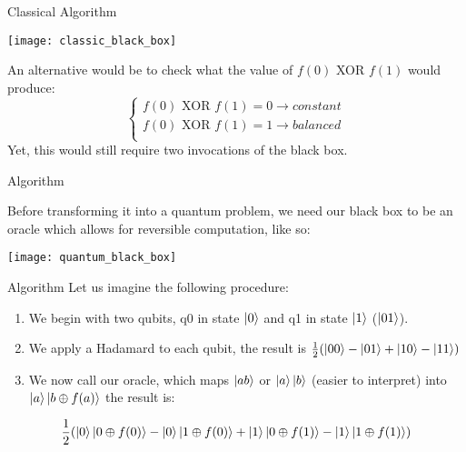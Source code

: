 \documentclass[aspectratio=43]{beamer}
\begin{document}
\begin{frame}{Classical Algorithm}
\begin{card}
    \begin{center}
        \texttt{[image: classic\_black\_box]}
    \end{center}
\end{card}
\begin{cardTiny}
    An alternative would be to check what the value of $f(0)$ XOR $f(1)$ would produce:
    \begin{equation*}
        \left\{\begin{matrix}
            f(0)\text{ XOR } f(1) = 0 \rightarrow constant\\ 
            f(0)\text{ XOR } f(1) = 1 \rightarrow balanced\\ 
        \end{matrix}\right.
    \end{equation*}
    Yet, this would still require two invocations of the black box.
\end{cardTiny}
\pagenumber
\end{frame}


\begin{frame}{\q Algorithm}
\begin{card}
    Before transforming it into a quantum problem, we need our black box to be an oracle which allows for reversible computation, like so:
    \begin{center}
        \texttt{[image: quantum\_black\_box]}
    \end{center}
\end{card}
\pagenumber
\end{frame}


\begin{frame}{\ds Algorithm}
Let us imagine the following procedure:\\
\begin{enumerate}
    \item We begin with two qubits, q0 in state $\ket{0}$ and q1 in state $\ket{1}$ ($\ket{01}$).
    \item We apply a Hadamard to each qubit, the result is $\frac{1}{2}(\ket{00} - \ket{01} + \ket{10} - \ket{11})$
    \item We now call our oracle, which maps $\ket{a b}$ or $\ket{a}\ket{b}$ (easier to interpret) into $\ket{a}\ket{b\oplus f(a)}$ the result is:
\end{enumerate}
\begin{equation}
     \frac{1}{2}(\ket{0}\ket{0\oplus f(0)} - \ket{0}\ket{1\oplus f(0)} + \ket{1}\ket{0\oplus f(1)} - \ket{1}\ket{1\oplus f(1)})
\end{equation}
\pagenumber
\end{frame}
\end{document}
